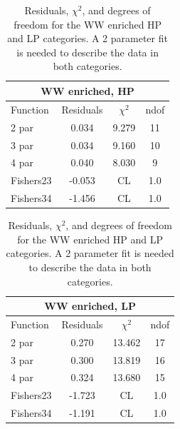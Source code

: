 \begin{table}[htb]
\centering
\begin{tabular}{|l c c c |}
\hline
\multicolumn{4}{|c|}{WW enriched, HP}\\
\hline
Function & Residuals & $\chi^2$ & ndof \\
\hline
2 par & 0.034 & 9.279 & 11 \\
3 par & 0.034 & 9.160 & 10 \\
4 par & 0.040 & 8.030 & 9 \\
\hline
\hline
Fishers23  & -0.053 &CL &1.0\\
Fishers34  & -1.456 &CL &1.0\\
\hline
\end{tabular}
\quad
\begin{tabular}{|l c c c |}
\hline
\multicolumn{4}{|c|}{WW enriched, LP}\\
\hline
Function & Residuals & $\chi^2$ & ndof \\
\hline
2 par & 0.270 & 13.462 & 17 \\
3 par & 0.300 & 13.819 & 16 \\
4 par & 0.324 & 13.680 & 15 \\
\hline
\hline
Fishers23 & -1.723& CL & 1.0\\
Fishers34 & -1.191& CL & 1.0\\
\hline
\end{tabular}
\caption{Residuals, $\chi^{2}$, and degrees of freedom for the WW enriched HP and LP categories. A 2 parameter fit is needed to describe the data in both categories.}
\label{tab:WW_enriched}
\end{table}


